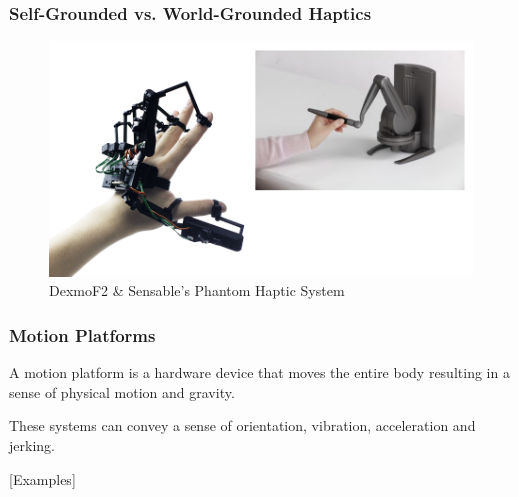 \begin{frame}
	\frametitle{Self-Grounded vs. World-Grounded Haptics}
	\begin{figure}
		\includegraphics[scale=0.3]{assets/self-world.png}
		\caption{DexmoF2 \& Sensable's Phantom Haptic System}
	\end{figure}
	
\end{frame}

\begin{frame}
	\frametitle{Motion Platforms}
	A motion platform is a hardware device that moves the entire body resulting in a sense of physical motion and gravity. 
	\vspace{.2in}
	
	
	These systems can convey a sense of orientation, vibration, acceleration and jerking.	
	\vspace{.2in}
	
	
	[Examples]
	
\end{frame}

{
      \begin{frame}[plain]
     \end{frame}
}

